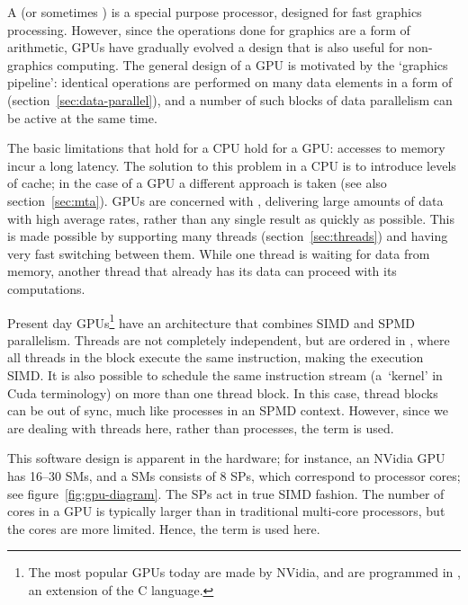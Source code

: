 A  (or sometimes ) is a special purpose processor,
designed for fast graphics processing. However, since the operations
done for graphics are a form of arithmetic, \acp{GPU} have gradually
evolved a design that is also useful for non-graphics computing.
The general design of a \ac{GPU} is motivated by the `graphics
pipeline': identical
operations are performed on many data elements
in a form of 
(section~\ref{sec:data-parallel}),
and a number of such
blocks of data parallelism can be active at the same time.

The basic limitations that hold for a CPU hold for a \ac{GPU}:
accesses to memory incur a long latency. The solution to this problem
in a CPU is to introduce levels of cache; in the case of a \ac{GPU} a
different approach is taken (see also
section~\ref{sec:mta}). \acp{GPU} are concerned with
, delivering large amounts of data
with high average rates, rather than any single result as quickly as
possible. This is made possible by supporting many threads
(section~\ref{sec:threads}) and having very fast switching between
them. While one thread is waiting for data from memory, another thread
that already has its data can proceed with its computations.

Present day \acp{GPU}\footnote{The most popular GPUs today are made by
  NVidia, and are programmed in , an extension of the
  C language.}%
have an architecture that combines \ac{SIMD}
and \ac{SPMD} parallelism. Threads are not completely independent, but
are ordered in , where all threads in the
block execute the same instruction, making the execution \ac{SIMD}. It
is also possible to schedule the same instruction stream
(a~`kernel' in Cuda terminology) on more than one
thread block. In this case, thread blocks can be out of sync, much
like processes in an \ac{SPMD} context. However, since we are dealing
with threads here, rather than processes, the term  is used.

This software design is apparent in the hardware; for instance, an
NVidia \ac{GPU} has 16--30 \acfp{SM}, and a \acp{SM} consists of 8
\acfp{SP}, which correspond to processor cores; see
figure~\ref{fig:gpu-diagram}. The \acp{SP} act in true SIMD fashion.
The number of cores in a \ac{GPU} is
typically larger than in traditional multi-core processors, but the
cores are more limited. Hence, the term  is used here.

